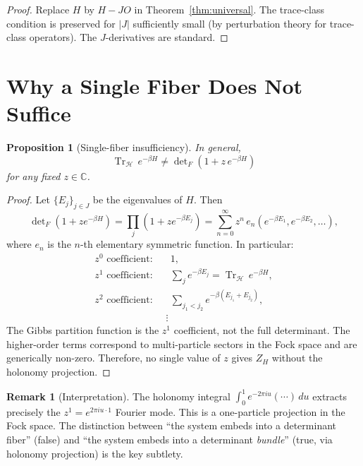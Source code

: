 \documentclass[12pt]{article}
\theoremstyle{plain}
\newtheorem{proposition}[theorem]{Proposition}
\theoremstyle{definition}
\newtheorem{remark}[theorem]{Remark}
\numberwithin{equation}{section}
\newcommand{\C}{\mathbb{C}}
\DeclareMathOperator{\Tr}{Tr}
\begin{document}
\begin{proof}
Replace $H$ by $H-JO$ in Theorem~\ref{thm:universal}.  The
trace-class condition is preserved for $|J|$ sufficiently small
(by perturbation theory for trace-class operators).  The $J$-derivatives
are standard.
\end{proof}


\section{Why a Single Fiber Does Not Suffice}\label{sec:singlefiber}

\begin{proposition}[Single-fiber insufficiency]\label{prop:singlefiber}
In general,
\begin{equation}
\Tr_{\mathcal{H}}\,e^{-\beta H}
\neq \det\nolimits_F\!\left(1+z\,e^{-\beta H}\right)
\end{equation}
for any fixed $z\in\C$.
\end{proposition}

\begin{proof}
Let $\{E_j\}_{j\in J}$ be the eigenvalues of $H$.  Then
\begin{equation}
\det\nolimits_F(1+ze^{-\beta H})
= \prod_j(1+ze^{-\beta E_j})
= \sum_{n=0}^{\infty}z^n\,e_n\!\left(e^{-\beta E_1},e^{-\beta E_2},\ldots\right),
\end{equation}
where $e_n$ is the $n$-th elementary symmetric function.  In particular:
\begin{align}
z^0\text{ coefficient:}&\quad 1,\\
z^1\text{ coefficient:}&\quad \sum_j e^{-\beta E_j}
= \Tr_{\mathcal{H}}\,e^{-\beta H},\\
z^2\text{ coefficient:}&\quad \sum_{j_1<j_2}e^{-\beta(E_{j_1}+E_{j_2})},\\
&\;\;\vdots
\end{align}
The Gibbs partition function is the $z^1$ coefficient, not the full
determinant.  The higher-order terms correspond to multi-particle
sectors in the Fock space and are generically non-zero.  Therefore,
no single value of $z$ gives $Z_H$ without the holonomy projection.
\end{proof}

\begin{remark}[Interpretation]
The holonomy integral $\int_0^1 e^{-2\pi iu}(\cdots)\,du$ extracts
precisely the $z^1=e^{2\pi iu\cdot 1}$ Fourier mode.  This is a
one-particle projection in the Fock space.  The distinction between
``the system embeds into a determinant fiber'' (false) and ``the
system embeds into a determinant \emph{bundle}'' (true, via
holonomy projection) is the key subtlety.
\end{remark}
\end{document}
